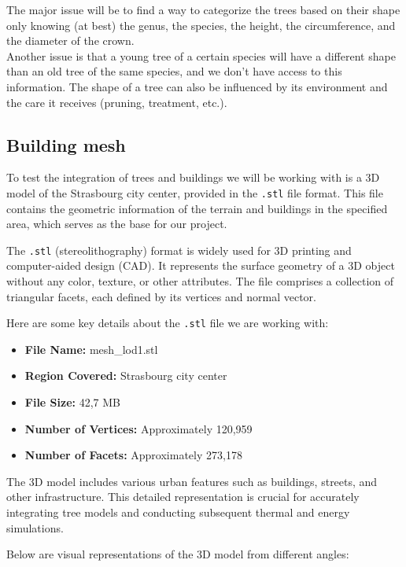 \documentclass[12pt]{article}
\begin{document}
The major issue will be to find a way to categorize the trees based on their shape
only knowing (at best) the genus, the species, the height, the circumference, and
the diameter of the crown. \\

Another issue is that a young tree of a certain species will have a different 
shape than an old tree of the same species, and we don't have access to this information.
 The shape of a tree can also be influenced by its environment and the care it 
 receives (pruning, treatment, etc.). \\
\subsection{Building mesh}

To test the integration of trees and buildings we will be working with is a 3D 
model of the Strasbourg city
center, provided in the \texttt{.stl} file format. This file contains the
geometric information of the terrain and buildings in the specified area,
which serves as the base for our project.

The \texttt{.stl}\cite{stl} (stereolithography) format is widely used for 3D printing
and computer-aided design (CAD). It represents the surface geometry of a 3D
object without any color, texture, or other attributes. The file comprises a
collection of triangular facets, each defined by its vertices and normal vector.

Here are some key details about the \texttt{.stl} file we are working with:
\begin{itemize}
    \item \textbf{File Name:} mesh\_lod1.stl
    \item \textbf{Region Covered:} Strasbourg city center
    \item \textbf{File Size:} 42,7 MB
    \item \textbf{Number of Vertices:} Approximately 120,959
    \item \textbf{Number of Facets:} Approximately 273,178
\end{itemize}

The 3D model includes various urban features such as buildings, streets, and
other infrastructure. This detailed representation is crucial for accurately
integrating tree models and conducting subsequent thermal and energy simulations.

Below are visual representations of the 3D model from different angles:
\end{document}
